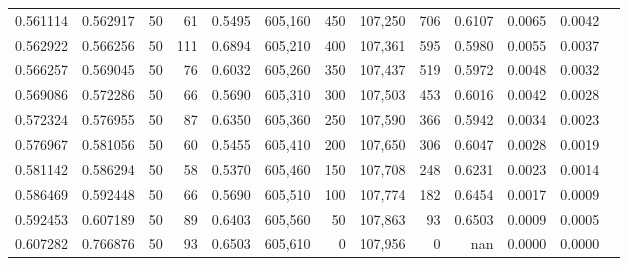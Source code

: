 \begin{tabular}{rrrrrrrrrrrrr}
0.561114 & 0.562917 &    50 &  61 &                                     0.5495 & 605,160 &     450 & 107,250 &     706 & 0.6107 & 0.0065 & 0.0042 \\
0.562922 & 0.566256 &    50 & 111 &                                     0.6894 & 605,210 &     400 & 107,361 &     595 & 0.5980 & 0.0055 & 0.0037 \\
0.566257 & 0.569045 &    50 &  76 &                                     0.6032 & 605,260 &     350 & 107,437 &     519 & 0.5972 & 0.0048 & 0.0032 \\
0.569086 & 0.572286 &    50 &  66 &                                     0.5690 & 605,310 &     300 & 107,503 &     453 & 0.6016 & 0.0042 & 0.0028 \\
0.572324 & 0.576955 &    50 &  87 &                                     0.6350 & 605,360 &     250 & 107,590 &     366 & 0.5942 & 0.0034 & 0.0023 \\
0.576967 & 0.581056 &    50 &  60 &                                     0.5455 & 605,410 &     200 & 107,650 &     306 & 0.6047 & 0.0028 & 0.0019 \\
0.581142 & 0.586294 &    50 &  58 &                                     0.5370 & 605,460 &     150 & 107,708 &     248 & 0.6231 & 0.0023 & 0.0014 \\
0.586469 & 0.592448 &    50 &  66 &                                     0.5690 & 605,510 &     100 & 107,774 &     182 & 0.6454 & 0.0017 & 0.0009 \\
0.592453 & 0.607189 &    50 &  89 &                                     0.6403 & 605,560 &      50 & 107,863 &      93 & 0.6503 & 0.0009 & 0.0005 \\
0.607282 & 0.766876 &    50 &  93 &                                     0.6503 & 605,610 &       0 & 107,956 &       0 &    nan & 0.0000 & 0.0000 \\
\bottomrule
\end{tabular}
